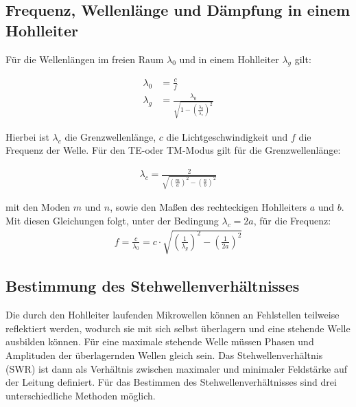 \subsection{Frequenz, Wellenlänge und Dämpfung in einem Hohlleiter}
Für die Wellenlängen im freien Raum $\lambda_0$ und in einem Hohlleiter $\lambda_g$ gilt:

\begin{align}
  \lambda_0 &= \frac{c}{f} \\
  \lambda_g &= \frac{\lambda_0}{\sqrt{1- \left( \frac{\lambda_0}{\lambda_c} \right)^2}}
\end{align}

Hierbei ist $\lambda_c$ die Grenzwellenlänge, $c$ die Lichtgeschwindigkeit und $f$
die Frequenz der Welle. Für den TE-oder TM-Modus gilt für die
Grenzwellenlänge:

\begin{align}
  \lambda_c = \frac{2}{\sqrt{\left(\frac{m}{a} \right)^2 - \left(\frac{n}{b} \right)^2}}
\end{align}

mit den Moden $m$ und $n$, sowie den Maßen des rechteckigen Hohlleiters $a$ und $b$.
Mit diesen Gleichungen folgt, unter der Bedingung $\lambda_c=2a$, für die Frequenz:
\begin{align}
  f = \frac{c}{\lambda_0} = c \cdot \sqrt{\left(\frac{1}{\lambda_g}\right)^2 - \left(\frac{1}{2a}\right)^2}
\end{align}




\subsection{Bestimmung des Stehwellenverhältnisses}
Die durch den Hohlleiter laufenden Mikrowellen können an Fehlstellen teilweise reflektiert
werden, wodurch sie mit sich selbst überlagern und eine stehende Welle ausbilden können.
Für eine maximale stehende Welle müssen Phasen und Amplituden der überlagernden Wellen
gleich sein. Das Stehwellenverhältnis (SWR) ist dann als Verhältnis zwischen maximaler
und minimaler Feldstärke auf der Leitung definiert. Für das Bestimmen des Stehwellenverhältnisses
sind drei unterschiedliche Methoden möglich.

